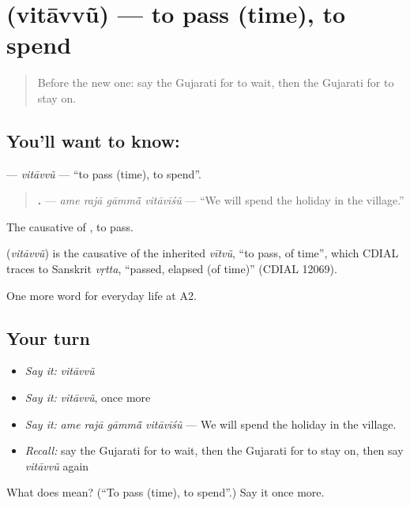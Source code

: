 \section[\texorpdfstring{\gu{વિતાવવું} (vitāvvũ)}{વિતાવવું (vitāvvũ)}]{ (vitāvvũ) — to pass (time), to spend}

\label{lesson:GU-C180-vitavvu}



\begin{quote}
Before the new one: say the Gujarati for to wait, then the Gujarati for to stay on.
\end{quote}

\subsection*{You'll want to know: }
\textbf{} — \emph{vitāvvũ} — \textquotedblleft{}to pass (time), to spend\textquotedblright{}.

\begin{quote}
\textbf{   .} — \emph{ame rajā gāmmā̃ vitāvīśũ} — \textquotedblleft{}We will spend the holiday in the village.\textquotedblright{}
\end{quote}

The causative of \textbf{}, to pass.

\begin{cousinweb}
\textbf{} (\emph{vitāvvũ}) is the causative of the inherited \emph{vītvũ}, \textquotedblleft{}to pass, of time\textquotedblright{}, which CDIAL traces to Sanskrit \emph{vṛtta}, \textquotedblleft{}passed, elapsed (of time)\textquotedblright{} (CDIAL 12069).
\end{cousinweb}

\begin{grammarlens}[title={What you've built}]
One more word for everyday life at A2.
\end{grammarlens}

\subsection*{Your turn}
\begin{itemize}
\raggedright
  \item \emph{Say it:} \emph{vitāvvũ}
  \item \emph{Say it:} \emph{vitāvvũ}, once more
  \item \emph{Say it:} \emph{ame rajā gāmmā̃ vitāvīśũ} — We will spend the holiday in the village.
  \item \emph{Recall:} say the Gujarati for to wait, then the Gujarati for to stay on, then say \emph{vitāvvũ} again
\end{itemize}

\begin{tcolorbox}[breakable,colback=teal!4,colframe=teal!35!black,title={Before you move on}]
What does  mean? (\textquotedblleft{}To pass (time), to spend\textquotedblright{}.) Say it once more.
\end{tcolorbox}

